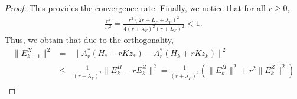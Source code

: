 \begin{proof}
\begin{comment}
\centering
\texttt{[image: plot1.png]}
\caption{Graphs of the convergence factor as a function of $r$ for $L_F = 5$ and $\lambda_F = 0.5$}\label{exam} 
\end{figure}
The graphs of $f(r)$ and $g(r)$ are presented in Figure \ref{exam} and a simple calculation shows that 
\begin{equation}
\frac{(L_F-\lambda_F)^2}{\lambda_F} = {\rm arg}\max_{r \geq 0} f(r). 
\end{equation} 
Furthermore, we have that
\begin{eqnarray*}
\frac{(L_F - \lambda_F)^2 + r^2 }{(2r + L_F + \lambda_F)^2} = \frac{1}{4} - g(r), 
\end{eqnarray*}
where 
\begin{eqnarray*}
g(r) = \frac{(L_F + \lambda_F)r - (L_F - \lambda_F)^2 + (L_F + \lambda_F)^2/4}{(2r + L_F + \lambda_F)^2}.  
\end{eqnarray*}
It is easy to see that 
\begin{equation}
2\frac{(L_F - \lambda_F)^2}{L_F + \lambda_F} = {\rm arg} \min_{r \geq 0} g(r) \quad \mbox{ and } \quad g \left (2 \frac{(L_F - \lambda_F)^2}{L_F + \lambda_F} \right ) < \frac{1}{4}.    
\end{equation}
Note also that it holds true that 
\begin{equation}
{\rm arg}\max_{r} g(r) \leq {\rm arg}\max_r f(r). 
\end{equation} 
Thus, the convergence rate can be estimated as follows: 
\begin{eqnarray*}
\|E_{k+1}^H\|^2 + \|E_{k+1}^Z\|^2_{\omega} &\leq& \max \left \{ \frac{1}{4}, \left ( 1 - \frac{L_F^2 \lambda_F^2 - 2\lambda_F^2L_F + 2\lambda_F^4}{((L_F - \lambda_F)^2 + \lambda_F^2)^2} \right ) \right \} \left ( \|E_{k}^H\|^2 + \|E_{k}^Z\|^2_{\omega}  \right ). 
\end{eqnarray*}
\end{comment} 
This provides the convergence rate. Finally, we notice that for all $r \geq 0$, 
\begin{eqnarray*}
\frac{r^2}{\omega^2} = \frac{r^2 (2r + L_F + \lambda_F)^2}{4(r + \lambda_F)^2(r + L_F)^2} < 1. 
\end{eqnarray*}
Thus, we obtain that due to the orthogonality, 
\begin{eqnarray*}
\|E_{k+1}^X\|^2 &=& \|A_r^*(H_* + rKz_*) - A_r^*(H_k + r K z_k) \|^2 \\
&\leq& \frac{1}{(r + \lambda_F)^2}\|E_k^H - r E_k^Z\|^2 = \frac{1}{(r + \lambda_F)^2} \left ( \|E_k^H\|^2 + r^2 \|E_k^Z\|^2 \right ) \\

\end{eqnarray*}
\end{proof}
